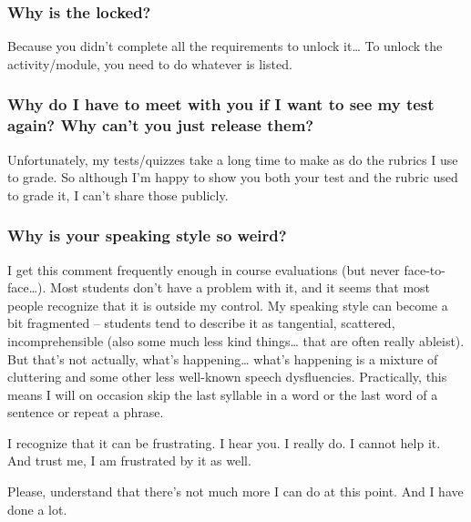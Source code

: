 \hypertarget{why-is-the-locked}{%
\subsubsection{\texorpdfstring{Why is the locked?}{Why is the  locked?}}\label{why-is-the-locked}}

Because you didn't complete all the requirements to unlock it\ldots{} To unlock the activity/module, you need to do whatever is listed.

\hypertarget{why-do-i-have-to-meet-with-you-if-i-want-to-see-my-test-again-why-cant-you-just-release-them}{%
\subsubsection{Why do I have to meet with you if I want to see my test again? Why can't you just release them?}\label{why-do-i-have-to-meet-with-you-if-i-want-to-see-my-test-again-why-cant-you-just-release-them}}

Unfortunately, my tests/quizzes take a long time to make as do the rubrics I use to grade. So although I'm happy to show you both your test and the rubric used to grade it, I can't share those publicly.

\hypertarget{why-is-your-speaking-style-so-weird}{%
\subsubsection{Why is your speaking style so weird?}\label{why-is-your-speaking-style-so-weird}}

I get this comment frequently enough in course evaluations (but never face-to-face\ldots). Most students don't have a problem with it, and it seems that most people recognize that it is outside my control. My speaking style can become a bit fragmented -- students tend to describe it as tangential, scattered, incomprehensible (also some much less kind things\ldots{} that are often really ableist). But that's not actually, what's happening\ldots{} what's happening is a mixture of cluttering and some other less well-known speech dysfluencies. Practically, this means I will on occasion skip the last syllable in a word or the last word of a sentence or repeat a phrase.

I recognize that it can be frustrating. I hear you. I really do. I cannot help it. And trust me, I am frustrated by it as well.

Please, understand that there's not much more I can do at this point. And I have done a lot.

